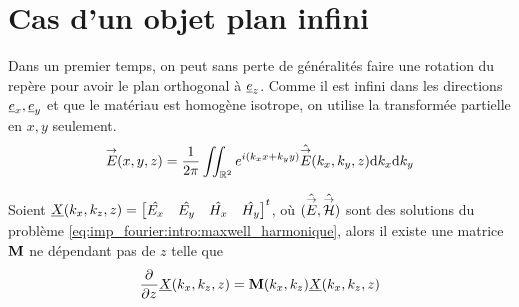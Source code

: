 \section{Cas d'un objet plan infini}
    
    \begin{figure}[!h]
    \centering
    \begin{tikzpicture}
    
    \end{tikzpicture}
    \end{figure}

    Dans un premier temps, on peut sans perte de généralités faire une rotation du repère pour avoir le plan orthogonal à $\v e_z$. Comme il est infini dans les directions $\v e_x, \v e_y$ et que le matériau est homogène isotrope, on utilise la transformée partielle en $x, y$ seulement.
    \begin{equation}
        \vE(x,y,z) = \frac{1}{2\pi}\iint_{\RR^2} e^{i(k_x x + k_y y)}\hat{\vE} (k_x,k_y,z) \dd{k_x}\dd{k_y}
    \end{equation}

    \begin{prop}
        Soient $\v{X}(k_x,k_z,z) =
        \begin{bmatrix}
        \hat{E_x} &
        \hat{E_y} &
        \hat{H_x} &
        \hat{H_y}
        \end{bmatrix}^t$,
        où $(\hat \vE,\hat \vH)$ sont des solutions du problème \eqref{eq:imp_fourier:intro:maxwell_harmonique}, alors il existe une matrice $\mat{M}$ ne dépendant pas de $z$ telle que 
        \begin{equation}
            \ddr{z}{}\v{X}(k_x,k_z,z) = \mat{M}(k_x,k_z) \v{X}(k_x,k_z,z)
            \label{eq:imp_fourier:plan:edo}
        \end{equation}
    \end{prop}

